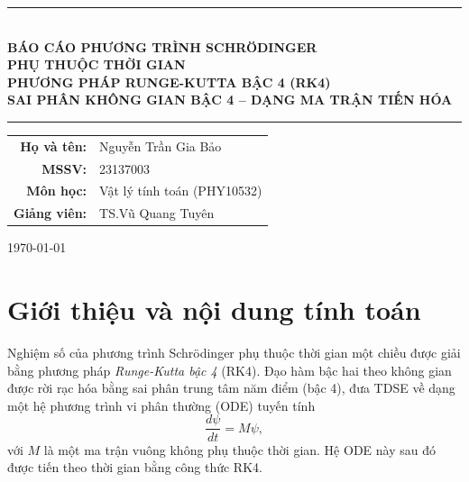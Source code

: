 \documentclass[12pt,a4paper]{article}
\begin{document}
\begin{titlepage}
    \centering
    \vspace*{1.6cm}

    \rule{\textwidth}{1pt} \\[0.5cm]
    {\huge \textbf{BÁO CÁO PHƯƠNG TRÌNH SCHRÖDINGER}} \\[0.35cm]
    {\Large \textbf{PHỤ THUỘC THỜI GIAN}} \\[0.35cm]
    {\large \textbf{PHƯƠNG PHÁP RUNGE-KUTTA BẬC 4 (RK4)}} \\[0.2cm]
    {\large \textbf{SAI PHÂN KHÔNG GIAN BẬC 4 -- DẠNG MA TRẬN TIẾN HÓA}} \\[0.2cm]
    \rule{\textwidth}{1pt}

    \vspace{2cm}

    {\large
    \begin{tabular}{rl}
        \textbf{Họ và tên:}  & Nguyễn Trần Gia Bảo \\[4pt]
        \textbf{MSSV:}       & 23137003 \\[4pt]
        \textbf{Môn học:}    & Vật lý tính toán (PHY10532) \\[4pt]
        \textbf{Giảng viên:} & TS.\@ Vũ Quang Tuyên \\
    \end{tabular}
    }

    \vfill
    {\large \today}
\end{titlepage}

\newpage
\tableofcontents
\newpage

\section{Giới thiệu và nội dung tính toán}

Nghiệm số của phương trình Schrödinger phụ thuộc thời gian một chiều được giải bằng phương pháp \textit{Runge-Kutta bậc 4} (RK4). Đạo hàm bậc hai theo không gian được rời rạc hóa bằng sai phân trung tâm năm điểm (bậc 4), đưa TDSE về dạng một hệ phương trình vi phân thường (ODE) tuyến tính
\[
\frac{d\psi}{dt}=M\psi,
\]
với $M$ là một ma trận vuông không phụ thuộc thời gian. Hệ ODE này sau đó được tiến theo thời gian bằng công thức RK4.
\end{document}
